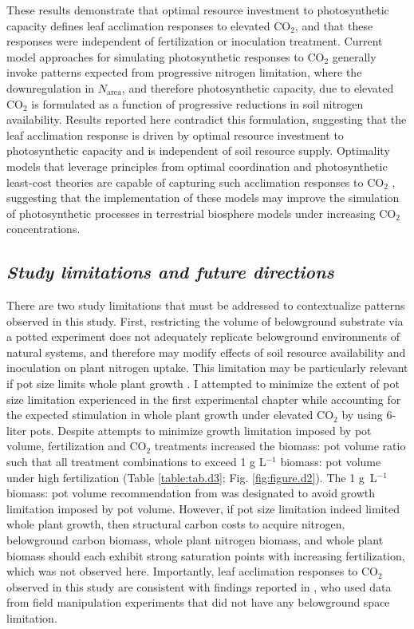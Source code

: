 These results demonstrate that optimal resource investment to photosynthetic capacity defines leaf acclimation responses to elevated CO$_2$, and that these responses were independent of fertilization or inoculation treatment. Current model approaches for simulating photosynthetic responses to CO$_2$ generally invoke patterns expected from progressive nitrogen limitation, where the downregulation in $N_\mathrm{area}$, and therefore photosynthetic capacity, due to elevated CO$_2$ is formulated as a function of progressive reductions in soil nitrogen availability. Results reported here contradict this formulation, suggesting that the leaf acclimation response is driven by optimal resource investment to photosynthetic capacity and is independent of soil resource supply. Optimality models that leverage principles from optimal coordination and photosynthetic least-cost theories  are capable of capturing such acclimation responses to CO$_2$ , suggesting that the implementation of these models may improve the simulation of photosynthetic processes in terrestrial biosphere models under increasing CO$_2$ concentrations.

\begin{singlespace}
    \subsection{\textit{Study limitations and future directions}}
\end{singlespace}
\noindent There are two study limitations that must be addressed to contextualize patterns observed in this study. First, restricting the volume of belowground substrate via a potted experiment does not adequately replicate belowground environments of natural systems, and therefore may modify effects of soil resource availability and inoculation on plant nitrogen uptake. This limitation may be particularly relevant if pot size limits whole plant growth . I attempted to minimize the extent of pot size limitation experienced in the first experimental chapter while accounting for the expected stimulation in whole plant growth under elevated CO$_2$ by using 6-liter pots. Despite attempts to minimize growth limitation imposed by pot volume, fertilization and CO$_2$ treatments increased the biomass: pot volume ratio such that all treatment combinations to exceed 1 g L$^{-1}$ biomass: pot volume under high fertilization (Table \ref{table:tab.d3}; Fig. \ref{fig:figure.d2}). The 1 g\ L$^{-1}$ biomass: pot volume recommendation from  was designated to avoid growth limitation imposed by pot volume. However, if pot size limitation indeed limited whole plant growth, then structural carbon costs to acquire nitrogen, belowground carbon biomass, whole plant nitrogen biomass, and whole plant biomass should each exhibit strong saturation points with increasing fertilization, which was not observed here.  Importantly, leaf acclimation responses to CO$_2$ observed in this study are consistent with findings reported in , who used data from field manipulation experiments that did not have any belowground space limitation.

